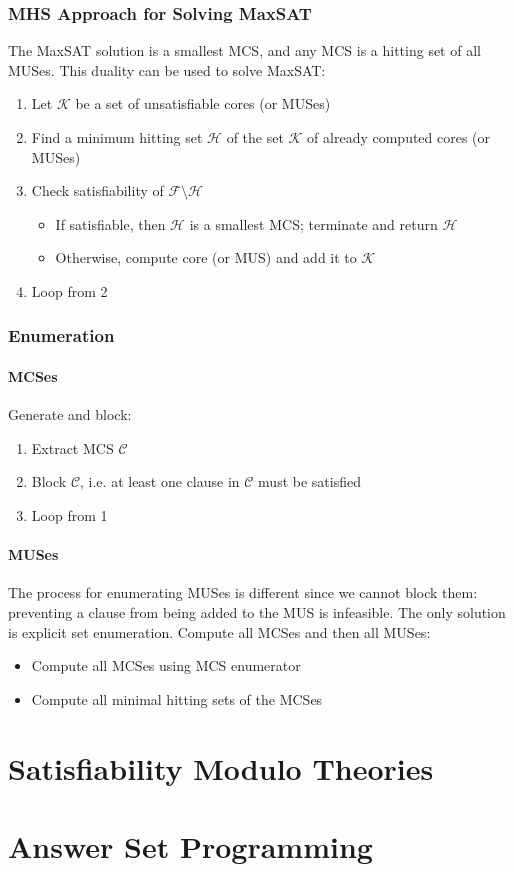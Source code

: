 \documentclass[10pt,a4paper]{report}
\begin{document}
\subsection{MHS Approach for Solving MaxSAT}
The MaxSAT solution is a smallest MCS, and any MCS is a hitting set of all MUSes. This duality can be used to solve MaxSAT:
\begin{enumerate}
    \item Let $\mathcal{K}$ be a set of unsatisfiable cores (or MUSes)
    \item Find a minimum hitting set $\mathcal{H}$ of the set $\mathcal{K}$ of already computed cores (or MUSes)
    \item Check satisfiability of $\mathcal{F} \setminus \mathcal{H}$
    \begin{itemize}
        \item If satisfiable, then $\mathcal{H}$ is a smallest MCS; terminate and return $\mathcal{H}$
        \item Otherwise, compute core (or MUS) and add it to $\mathcal{K}$
    \end{itemize}
    \item Loop from 2
\end{enumerate}
\subsection{Enumeration}
\subsubsection{MCSes}
Generate and block:
\begin{enumerate}
    \item Extract MCS $\mathcal{C}$
    \item Block $\mathcal{C}$, i.e. at least one clause in $\mathcal{C}$ must be satisfied
    \item Loop from 1
\end{enumerate}
\subsubsection{MUSes}
The process for enumerating MUSes is different since we cannot block them: preventing a clause from being added to the MUS is infeasible. The only solution is explicit set enumeration. Compute all MCSes and then all MUSes:
\begin{itemize}
    \item Compute all MCSes using MCS enumerator
    \item Compute all minimal hitting sets of the MCSes
\end{itemize}

\chapter{Satisfiability Modulo Theories}
\chapter{Answer Set Programming}
\end{document}
